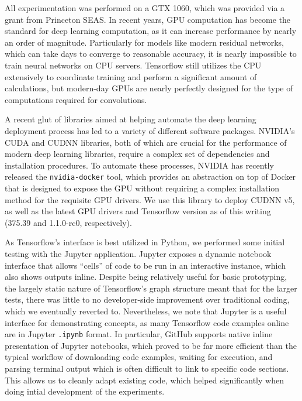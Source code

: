 All experimentation was performed on a GTX 1060, which was provided via a grant from Princeton SEAS.
In recent years, GPU computation has become the standard for deep learning computation, as it can increase performance by nearly an order of magnitude.
Particularly for models like modern residual networks, which can take days to converge to reasonable accuracy, it is nearly impossible to train neural networks on CPU servers.
Tensorflow still utilizes the CPU extensively to coordinate training and perform a significant amount of calculations, but modern-day GPUs are nearly perfectly designed for the type of computations required for convolutions.

A recent glut of libraries aimed at helping automate the deep learning deployment process has led to a variety of different software packages.
NVIDIA's CUDA and CUDNN libraries, both of which are crucial for the performance of modern deep learning libraries, require a complex set of dependencies and installation procedures.
To automate these processes, NVIDIA has recently released the \texttt{nvidia-docker} tool, which provides an abstraction on top of Docker that is designed to expose the GPU without requiring a complex installation method for the requisite GPU drivers.
We use this library to deploy CUDNN v5, as well as the latest GPU drivers and Tensorflow version as of this writing (375.39 and 1.1.0-rc0, respectively).

As Tensorflow's interface is best utilized in Python, we performed some initial testing with the Jupyter application.
Jupyter exposes a dynamic notebook interface that allows ``cells'' of code to be run in an interactive instance, which also shows outputs inline.
Despite being relatively useful for basic prototyping, the largely static nature of Tensorflow's graph structure meant that for the larger tests, there was little to no developer-side improvement over traditional coding, which we eventually reverted to.
Nevertheless, we note that Jupyter is a useful interface for demonstrating concepts, as many Tensorflow code examples online are in Jupyter \texttt{.ipynb} format.
In particular, GitHub supports native inline presentation of Jupyter notebooks, which proved to be far more efficient than the typical workflow of downloading code examples, waiting for execution, and parsing terminal output which is often difficult to link to specific code sections.
This allows us to cleanly adapt existing code, which helped significantly when doing intial development of the experiments.

